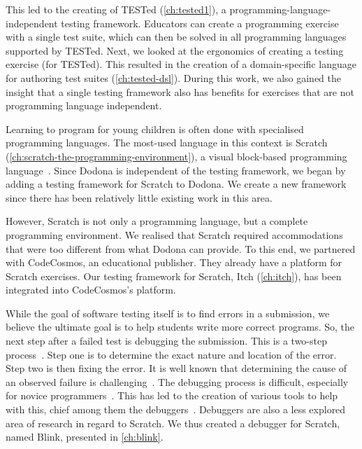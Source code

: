 \documentclass[./main]{subfiles}
\begin{document}
This led to the creating of TESTed (\cref{ch:tested1}), a programming-language-independent testing framework.
Educators can create a programming exercise with a single test suite, which can then be solved in all programming languages supported by TESTed.
Next, we looked at the ergonomics of creating a testing exercise (for TESTed).
This resulted in the creation of a domain-specific language for authoring test suites (\cref{ch:tested-dsl}).
During this work, we also gained the insight that a single testing framework also has benefits for exercises that are not programming language independent.

Learning to program for young children is often done with specialised programming languages.
The most-used language in this context is Scratch (\cref{ch:scratch-the-programming-environment}), a visual block-based programming language~\autocite{resnickScratchProgrammingAll2009}.
Since Dodona is independent of the testing framework, we began by adding a testing framework for Scratch to Dodona.
We create a new framework since there has been relatively little existing work in this area.

However, Scratch is not only a programming language, but a complete programming environment.
We realised that Scratch required accommodations that were too different from what Dodona can provide.
To this end, we partnered with CodeCosmos, an educational publisher.
They already have a platform for Scratch exercises.
Our testing framework for Scratch, Itch (\cref{ch:itch}), has been integrated into CodeCosmos's platform.

While the goal of software testing itself is to find errors in a submission, we believe the ultimate goal is to help students write more correct programs.
So, the next step after a failed test is debugging the submission.
This is a two-step process~\autocite{myersArtSoftwareTesting2012}.
Step one is to determine the exact nature and location of the error.
Step two is then fixing the error.
It is well known that determining the cause of an observed failure is challenging~\autocite{ammannIntroductionSoftwareTesting2016}.
The debugging process is difficult, especially for novice programmers~\autocite{mccauleyDebuggingReviewLiterature2008}.
This has led to the creation of various tools to help with this, chief among them the debuggers~\autocite{rosenbergHowDebuggersWork1996}.
Debuggers are also a less explored area of research in regard to Scratch.
We thus created a debugger for Scratch, named Blink, presented in \cref{ch:blink}.
\end{document}
